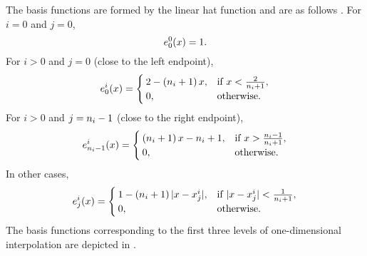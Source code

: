 
The basis functions are formed by the linear hat function and are as follows
\cite{klimke2006}. For $i = 0$ and $j = 0$,
\[
  e^0_0(x) = 1.
\]
For $i > 0$ and $j = 0$ (close to the left endpoint),
\[
  e^i_0(x) = \begin{cases}
    2 - \left( n_i + 1 \right) x, & \text{if } x < \frac{2}{n_i + 1}, \\
    0, & \text{otherwise}.
  \end{cases}
\]
For $i > 0$ and $j = n_i - 1$ (close to the right endpoint),
\[
  e^i_{n_i - 1}(x) = \begin{cases}
    \left( n_i + 1 \right) x - n_i + 1, & \text{if } x > \frac{n_i - 1}{n_i + 1}, \\
    0, & \text{otherwise}.
  \end{cases}
\]
In other cases,
\[
  e^i_j(x) = \begin{cases}
    1 - \left( n_i + 1 \right)|x - x^i_j|, & \text{if } |x - x^i_j| < \frac{1}{n_i + 1}, \\
    0, & \text{otherwise}.
  \end{cases}
\]
The basis functions corresponding to the first three levels of one-dimensional
interpolation are depicted in .
